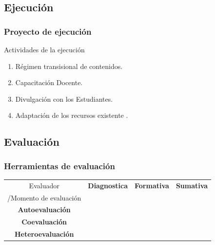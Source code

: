 \documentclass{beamer}
\begin{document}
\subsection{Ejecuci\'on}

\begin{frame}
\frametitle{Proyecto de ejecuci\'on} 
\begin{center}
\begin{block}{Actividades de la ejecuci\'on}
\begin{enumerate}
\item R\'egimen transisional de contenidos.
\item Capacitaci\'on Docente.
\item Divulgaci\'on con los Estudiantes.
\item Adaptaci\'on de los recursos existente .
\end{enumerate}
\end{block}
\end{center}
\end{frame}
\subsection{Evaluaci\'on}
\begin{frame}
\frametitle{Herramientas de evaluaci\'on}
\begin{center}
\begin{table}
\begin{tabular}{|c|c|c|c|}
\hline
Evaluador& \textbf{Diagnostica} & \textbf{Formativa} &\textbf{Sumativa}\\
/Momento de evaluaci\'on & & &\\
\hline
\textbf{Autoevaluaci\'on} & & & \\
\textbf{Coevaluaci\'on} & & & \\
\textbf{Heteroevaluaci\'on} & & & \\
\hline
\end{tabular}
\end{table}
\end{center}
\end{frame}
\end{document}
